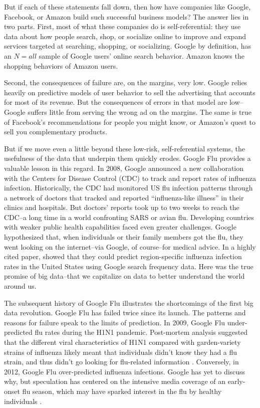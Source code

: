 \documentclass[12pt]{article}
\begin{document}
But if each of these statements fall down, then how have companies
like Google, Facebook, or Amazon build such successful business
models? The answer lies in two parts. First, most of what these
companies do is self-referential: they use data about how people
search, shop, or socialize online to improve and expand services
targeted at searching, shopping, or socializing. Google by definition,
has an $N=all$ sample of Google users' online search
behavior. Amazon knows the shopping behaviors of Amazon users. 

Second, the consequences of failure are, on the margins, very
low. Google relies heavily on predictive models of user behavior to
sell the advertising that accounts for most of its revenue. But the
consequences of errors in that model are low--Google suffers little
from serving the wrong ad on the margins. The same is true of
Facebook's recommendations for people you might know, or Amazon's
quest to sell you complementary products. 

But if we move even a little beyond these low-risk, self-referential
systems, the usefulness of the data that underpin them quickly
erodes. Google Flu provides a valuable lesson in this regard. In 2008,
Google announced a new collaboration with the Centers for Disease
Control (CDC) to track and report rates of influenza
infection. Historically, the CDC had monitored US flu infection
patterns through a network of doctors that tracked and reported
``influenza-like illness'' in their clinics and hospitals. But
doctors' reports took up to two weeks to reach the CDC--a long time in
a world confronting SARS or avian flu. Developing countries with
weaker public health capabilities faced even greater
challenges. Google hypothesized that, when individuals or their family
members got the flu, they went looking on the internet--via Google, of
course--for medical advice. In a highly cited paper,
\cite{ginsberg2008detecting} showed that they could predict
region-specific influenza infection rates in the United States using
Google search frequency data. Here was the true promise of big
data--that we capitalize on data to better understand the world around
us.

The subsequent history of Google Flu illustrates the shortcomings of
the first big data revolution. Google Flu has failed twice since its
launch. The patterns and reasons for failure speak to the limits of
prediction. In 2009, Google Flu under-predicted flu rates during the
H1N1 pandemic. Post-mortem analysis suggested that the different viral
characteristics of H1N1 compared with garden-variety strains of
influenza likely meant that individuals didn't know they had a flu
strain, and thus didn't go looking for flu-related information
\citep{cook2011assessing}. Conversely, in 2012, Google Flu
over-predicted influenza infections. Google has yet to discuss why,
but speculation has centered on the intensive media coverage of an
early-onset flu season, which may have sparked interest in the flu by
healthy individuals \citep{butler2013google}.
\end{document}
